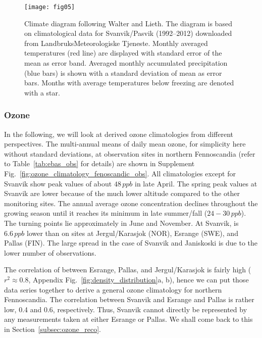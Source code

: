 \documentclass[bg, manuscript]{copernicus}
\begin{document}
\begin{figure}[t]
  \texttt{[image: fig05]}
  \caption{Climate diagram following Walter and Lieth. The diagram is based on climatological data for Svanvik/Pasvik (1992--2012) downloaded from LandbruksMeteorologiske Tjeneste. Monthly averaged temperatures (red line) are displayed with standard error of the mean as error band. Averaged monthly accumulated precipitation (blue bars) is shown with a standard deviation of mean as error bars. Months with average temperatures below freezing are denoted with a star.}
  \label{fig:climatediagram}
\end{figure}

\subsubsection{Ozone}
\label{subsubsec:clim_ozone}
In the following, we will look at derived ozone climatologies from different perspectives.
The multi-annual means of daily mean ozone, for simplicity here without standard deviations, at observation sites in northern Fennoscandia (refer to Table~\ref{tab:ebas_obs} for details) are shown in Supplement Fig.~\ref{fig:ozone_climatology_fenoscandic_obs}. All climatologies except for Svanvik show peak values of about $48\,\unit{ppb}$ in late April. The spring peak values at Svanvik are lower because of the much lower altitude compared to the other monitoring sites. The annual average ozone concentration \chem{\left<[O_3]\right>} declines throughout the growing season until it reaches its minimum in late summer/fall ($24-30\,\unit{ppb}$). The turning points lie approximately in June and November. At Svanvik, \chem{\left<[O_3]\right>} is $6.6\,\unit{ppb}$ lower than on sites at Jergul/Karasjok (NOR), Esrange (SWE), and Pallas (FIN). The large spread in the case of Svanvik and Janiskoski is due to the lower number of observations.

The correlation of \chem{[O_3]} between Esrange, Pallas, and Jergul/Karasjok is fairly high ($r^2\approx 0.8$, Appendix Fig.~\ref{fig:density_distribution}a, b), hence we can put those data series together to derive a general ozone climatology for northern Fennoscandia. The correlation between Svanvik and Esrange and Pallas is rather low, 0.4 and 0.6, respectively. Thus, Svanvik cannot directly be represented by any measurements taken at either Esrange or Pallas. We shall come back to this in Section~\ref{subsec:ozone_reco}.
\end{document}
